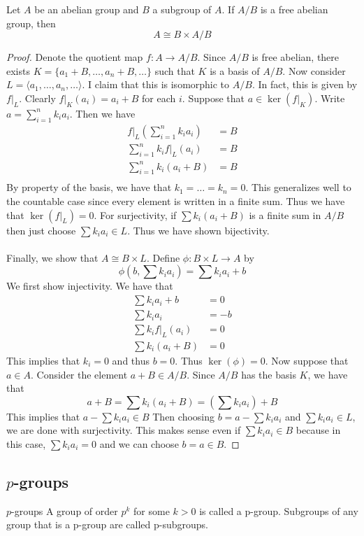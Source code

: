 \documentclass[a4paper]{article}
\begin{document}
\begin{prp}{}{} Let $A$ be an abelian group and $B$ a subgroup of $A$. If $A/B$ is a free abelian group, then $$A\cong B\times A/B$$ \tcbline
\begin{proof}
Denote the quotient map $f:A\to A/B$. Since $A/B$ is free abelian, there exists $K=\{a_1+B,\dots,a_n+B,\dots\}$ such that $K$ is a basis of $A/B$. Now consider $L=\langle a_1,\dots,a_n,\dots\rangle$. I claim that this is isomorphic to $A/B$. In fact, this is given by $f|_L$. Clearly $f|_K(a_i)=a_i+B$ for each $i$. Suppose that $a\in\ker(f|_K)$. Write $a=\sum_{i=1}^nk_ia_i$. Then we have 
\begin{align*}
f|_L\left(\sum_{i=1}^nk_ia_i\right)&=B\\
\sum_{i=1}^nk_if|_L(a_i)&=B\\
\sum_{i=1}^nk_i(a_i+B)&=B\\
\end{align*}
By property of the basis, we have that $k_1=\dots=k_n=0$. This generalizes well to the countable case since every element is written in a finite sum. Thus we have that $\ker(f|_L)=0$. For surjectivity, if $\sum k_i(a_i+B)$ is a finite sum in $A/B$ then just choose $\sum k_ia_i\in L$. Thus we have shown bijectivity. \\~\\
Finally, we show that $A\cong B\times L$. Define $\phi:B\times L\to A$ by $$\phi\left(b,\sum k_ia_i\right)=\sum k_ia_i+b$$ We first show injectivity. We have that 
\begin{align*}
\sum k_ia_i+b&=0\\
\sum k_ia_i&=-b\\
\sum k_if|_L(a_i)&=0\\
\sum k_i(a_i+B)&=0
\end{align*}
This implies that $k_i=0$ and thus $b=0$. Thus $\ker(\phi)=0$. Now suppose that $a\in A$. Consider the element $a+B\in A/B$. Since $A/B$ has the basis $K$, we have that $$a+B=\sum k_i(a_i+B)=\left(\sum k_ia_i\right)+B$$ This implies that $a-\sum k_ia_i\in B$ Then choosing $b=a-\sum k_ia_i$ and $\sum k_ia_i\in L$, we are done with surjectivity. This makes sense even if $\sum k_ia_i\in B$ because in this case, $\sum k_ia_i=0$ and we can choose $b=a\in B$. 
\end{proof}
\end{prp}

\subsection{$p$-groups}
\begin{defn}{$p$-groups}{} A group of order $p^k$ for some $k>0$ is called a p-group. Subgroups of any group that is a p-group are called p-subgroups. 
\end{defn}
\end{document}
